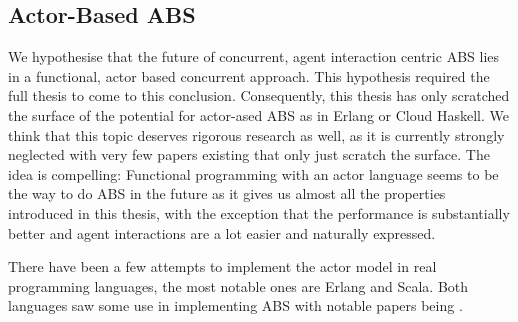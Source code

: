 

\subsection{Actor-Based ABS}
We hypothesise that the future of concurrent, agent interaction centric ABS lies in a functional, actor based concurrent approach. This hypothesis required the full thesis to come to this conclusion. Consequently, this thesis has only scratched the surface of the potential for actor-ased ABS as in Erlang or Cloud Haskell. We think that this topic deserves rigorous research as well, as it is currently strongly neglected with very few papers existing that only just scratch the surface. The idea is compelling: Functional programming with an actor language seems to be the way to do ABS in the future as it gives us almost all the properties introduced in this thesis, with the exception that the performance is substantially better and agent interactions are a lot easier and naturally expressed.

There have been a few attempts to implement the actor model in real programming languages, the most notable ones are Erlang and Scala. Both languages saw some use in implementing ABS with notable papers being \cite{bezirgiannis_improving_2013,di_stefano_using_2005, di_stefano_exat:_2007,  sher_agent-based_2013, varela_modelling_2004}.



